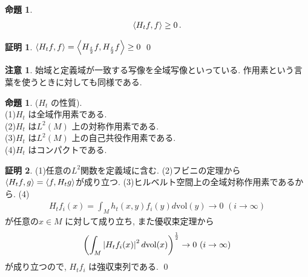 \documentclass[twocolumn, landscape, a4paper , 8pt, fleqn, titlepage ]{jsarticle}
\theoremstyle{definition}
\newtheorem{prop}[dfn]{命題}
\newtheorem*{pf*}{証明}
\newtheorem{remark}[dfn]{注意}
\newcommand{\paren}[1]{\mleft( #1\mright )}
\newcommand{\tbra}[1]{\mleft\langle#1\mright\rangle}
\newcommand{\abs}[1]{\left|#1\right|}
\newcommand{\vol}{\textrm{vol}}
\renewcommand{\-}{\hyphen}
\begin{document}
\begin{prop}
\begin{align*} \tbra{H_t f, f} \geq 0  \, .\end{align*}
\end{prop}
\begin{pf*}
$\tbra{H_tf, f} = \tbra{H_{\frac{t}{2} } f,  H_{\frac{t}{2} } f} \geq 0$
\qed
\end{pf*}


\begin{remark}
始域と定義域が一致する写像を全域写像といっている. 作用素という言葉を使うときに対しても同様である.
\end{remark}

\begin{prop}($H_t$ の性質). \\
(1)$H_t$ は全域作用素である. \\
(2)$H_t$ は$L^2(M)$ 上の対称作用素である. \\
(3)$H_t$ は$L^2(M)$ 上の自己共役作用素である. \\
(4)$H_t$ はコンパクトである. \\
\end{prop}
\begin{pf*}
(1)任意の$L^2$関数を定義域に含む. (2)フビニの定理から$\tbra{H_t f , g} = \tbra{f, H_t g}$が成り立つ. (3)ヒルベルト空間上の全域対称作用素であるから. (4)
\begin{align*} H_t f_i (x) = \int_M h_t (x,y) f_i (y) d \vol(y) \rightarrow 0 \,\, (i \rightarrow \infty ) \end{align*} 
が任意の$x \in M$ に対して成り立ち, また優収束定理から
\begin{align*} \paren{\int_M \abs{H_t f_i (x)}^2 d \vol(x)}^{\frac{1}{2}} \rightarrow 0 \,\, (i \rightarrow \infty )\end{align*}
が成り立つので, $H_t f_i$ は強収束列である. 
\qed
\end{pf*}
\end{document}
